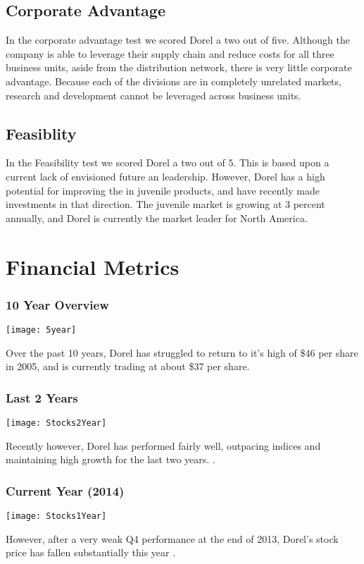{\subsection{Corporate Advantage}
In the corporate advantage test we scored Dorel a two out of five. Although the company is able to leverage their supply chain and reduce costs for all three business units, aside from the distribution network, there is very little corporate advantage.  Because each of the divisions are in completely unrelated markets, research and development cannot be leveraged across business units.

\subsection{Feasiblity}
In the Feasibility test we scored Dorel a two out of 5. This is based upon a current lack of envisioned future an leadership.  However, Dorel has a high potential for improving the in juvenile products, and have recently made investments in that direction. The juvenile market is growing at 3 percent annually, and Dorel is currently the market leader for North America. 

\section{Financial Metrics}
\label{chp:financials}
\subsubsection{10 Year Overview}
\centerline{\texttt{[image: 5year]}}
Over the past 10 years, Dorel has struggled to return to it's high of \$46 per share in 2005, and is currently trading at about \$37 per share.   

\subsubsection{Last 2 Years}
\centerline{\texttt{[image: Stocks2Year]}}
Recently however, Dorel has performed fairly well, outpacing indices and maintaining high growth for the last two years. \cite{YahooFinance2014}.

\subsubsection{Current Year (2014)}
\centerline{\texttt{[image: Stocks1Year]}}
However, after a very weak Q4 performance at the end of 2013, Dorel's stock price has fallen substantially this year \cite{YahooFinance2014}.

}
